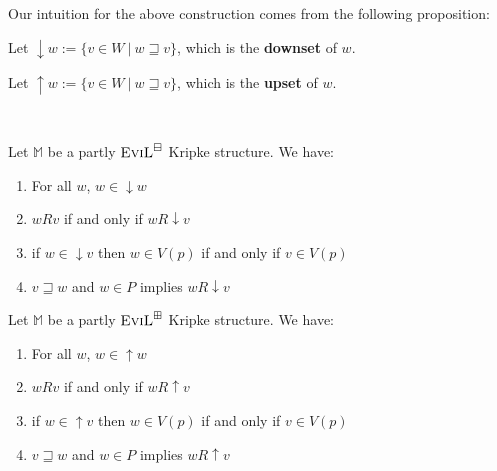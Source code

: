 Our intuition for the above construction comes from the following proposition:
\begin{mydef}
Let $\downarrow w := \{ v \in W \ |\ w \sqsupseteq v\}$, which is the
\textbf{downset} of $w$.

Let $\uparrow w := \{ v \in W \ |\ w \sqsupseteq v\}$, which is the
\textbf{upset} of $w$.
\end{mydef}

\begin{lemma}\label{downset-upset-lemma}\ \\
\begin{minipage}[b]{0.5\linewidth}
Let $\mathbb{M}$ be a partly $\textsc{EviL}^\boxminus$ Kripke structure. We have:
\begin{enumerate}[label=\textup{(\emph{\arabic*})$^\BM$},
  topsep=0.075in, parsep=0.075in]
  \item For all $w$, $w \in \downarrow w$
  \item $w R v$ if and only if $w R \downarrow v$
  \item if $w \in \downarrow v$ then $w \in V(p)$ if and only if $v
    \in V(p)$
  \item $v \sqsupseteq w$ and $w \in P$ implies $w R \downarrow v$
\end{enumerate}
\end{minipage}
\hspace{0.5cm}
\begin{minipage}[b]{0.5\linewidth}
Let $\mathbb{M}$ be a partly $\textsc{EviL}^\boxplus$ Kripke structure.  We have:
\begin{enumerate}[label=\textup{(\emph{\arabic*})$^\BP$}, topsep=0.075in, parsep=0.075in]
  \item For all $w$, $w \in \uparrow w$
  \item $w R v$ if and only if $w R \uparrow v$
  \item if $w \in \uparrow v$ then $w \in V(p)$ if and only if $v
    \in V(p)$
  \item $v \sqsupseteq w$ and $w \in P$ implies $w R \uparrow v$
\end{enumerate}
\end{minipage}
\end{lemma}
